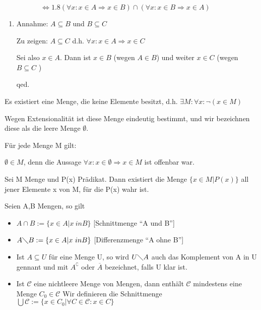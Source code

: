 \documentclass{../../meta/tudscript}
\begin{document}
\(\hspace{37pt} \qquad \Leftrightarrow{1.8} (\forall x: x\in A \Rightarrow x \in B) \cap (\forall x: x \in B \Rightarrow x \in A)\)

\begin{enumerate}
\def\labelenumi{\arabic{enumi}.}
\setcounter{enumi}{2}
\item
  Annahme: \(A \subseteq B\) und \(B \subseteq C\)

  Zu zeigen: \(A \subseteq C\) d.h.
  \(\forall x: x \in A \Rightarrow x \in C\)

  Sei also \(x \in A\). Dann ist \(x \in B\) (wegen \(A \in B\)) und
  weiter \(x \in C\) (wegen \(B \subseteq C\) )

  qed.
\end{enumerate}


Es existiert eine Menge, die keine Elemente besitzt, d.h.
\(\exists M: \forall x: \neg (x \in M)\)

Wegen Extensionalität ist diese Menge eindeutig bestimmt, und wir
bezeichnen diese als die leere Menge \(\emptyset\).

Für jede Menge M gilt:

\(\emptyset \in M\), denn die Aussage
\(\forall x: x \in \emptyset \Rightarrow x \in M\) ist offenbar war.


Sei M Menge und P(x) Prädikat. Dann existiert die Menge
\(\{x \in M \vert P(x)\}\) all jener Elemente x von M, für die P(x) wahr
ist.


Seien A,B Mengen, so gilt

\begin{itemize}

\item
  \(A \cap B := \{x \in A \vert x \ in B\}\) {[}Schnittmenge ``A und
  B''{]}
\item
  \(A \diagdown B := \{x \in A \vert x \ in B\}\) {[}Differenzmenge ``A
  ohne B''{]}
\item
  Ist \(A \subseteq U\) für eine Menge U, so wird \(U \diagdown A\) auch
  das Komplement von A in U gennant und mit \({A}^\complement\) oder
  \(\overline{A}\) bezeichnet, falls U klar ist.
\item
  Ist \(\mathscr{C}\) eine nichtleere Menge von Mengen, dann enthält
  \(\mathscr{C}\) mindestens eine Menge \(C_0 \in \mathscr{C}\) Wir
  definieren die Schnittmenge
  \(\bigcup\mathscr{C} := \{x \in C_0 \vert \forall C \in \mathscr{C}: x \in C\}\)
\end{itemize}
\end{document}
